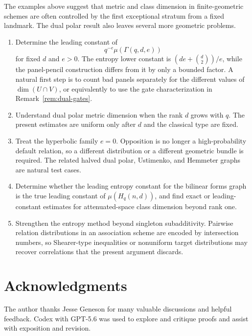 \documentclass[11pt]{article}
\theoremstyle{definition}
\theoremstyle{remark}
\begin{document}
The examples above suggest that metric and class dimension in
finite-geometric schemes are often controlled by the first exceptional
stratum from a fixed landmark.  The dual polar result also leaves several
more geometric problems.
\begin{enumerate}[label=(\arabic*), leftmargin=2.2em]
\item Determine the leading constant of
\[
        q^{-e}\mu(\Gamma(q,d,e))
\]
for fixed $d$ and $e>0$.  The entropy lower constant is
$(de+\binom d2)/e$, while the panel-pencil construction differs from it by
only a bounded factor.  A natural first step is to count bad panels
separately for the different values of $\dim(U\cap V)$, or equivalently to
use the gate characterization in Remark~\ref{rem:dual-gates}.

\item Understand dual polar metric dimension when the rank $d$ grows with
$q$.  The present estimates are uniform only after $d$ and the classical
type are fixed.

\item Treat the hyperbolic family $e=0$.  Opposition is no longer a
high-probability default relation, so a different distribution or a
different geometric bundle is required.  The related halved dual polar,
Ustimenko, and Hemmeter graphs are natural test cases.

\item Determine whether the leading entropy constant for the bilinear 
forms
graph is the true leading constant of $\mu(H_q(n,d))$, and find exact or
leading-constant estimates for attenuated-space class dimension beyond 
rank
one.

\item Strengthen the entropy method beyond singleton subadditivity.
Pairwise relation distributions in an association scheme are encoded by
intersection numbers, so Shearer-type inequalities or nonuniform target
distributions may recover correlations that the present argument discards.
\end{enumerate}

\section*{Acknowledgments}

The author thanks Jesse Geneson for many valuable discussions and helpful feedback.
Codex with GPT-5.6 was used to
explore and critique proofs and assist with exposition and revision.
\end{document}
